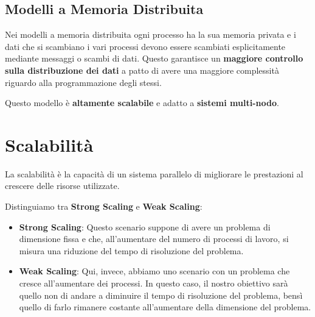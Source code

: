 \subsection*{Modelli a Memoria Distribuita}
Nei modelli a memoria distribuita ogni processo ha la sua memoria privata e i dati che si scambiano i vari processi devono essere scambiati esplicitamente mediante messaggi o scambi di dati. Questo garantisce un \textbf{maggiore controllo sulla distribuzione dei dati} a patto di avere una maggiore complessità riguardo alla programmazione degli stessi. 

Questo modello è \textbf{altamente scalabile} e adatto a \textbf{sistemi multi-nodo}.
\section{Scalabilità}
La scalabilità è la capacità di un sistema parallelo di migliorare le prestazioni al crescere delle risorse utilizzate.

Distinguiamo tra \textbf{Strong Scaling} e \textbf{Weak Scaling}:
\begin{itemize}
    \item \textbf{Strong Scaling}: Questo scenario suppone di avere un problema di dimensione fissa e che, all'aumentare del numero di processi di lavoro, si misura una riduzione del tempo di risoluzione del problema.
    \item \textbf{Weak Scaling}: Qui, invece, abbiamo uno scenario con un problema che cresce all'aumentare dei processi. In questo caso, il nostro obiettivo sarà quello non di andare a diminuire il tempo di risoluzione del problema, bensì quello di farlo rimanere costante all'aumentare della dimensione del problema.
\end{itemize}

